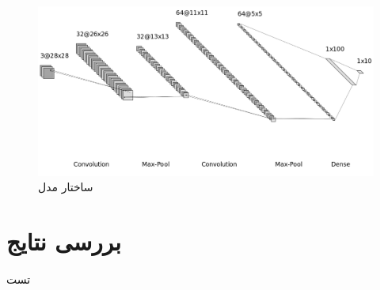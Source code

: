 \begin{figure}[t]
	\centering
	\includegraphics[scale=0.47]{images/chap5/cnn.png}%
	\caption{
		ساختار مدل 
	}
	\label{cnn}
	\centering
\end{figure}



\section{بررسی نتایج}
تست



